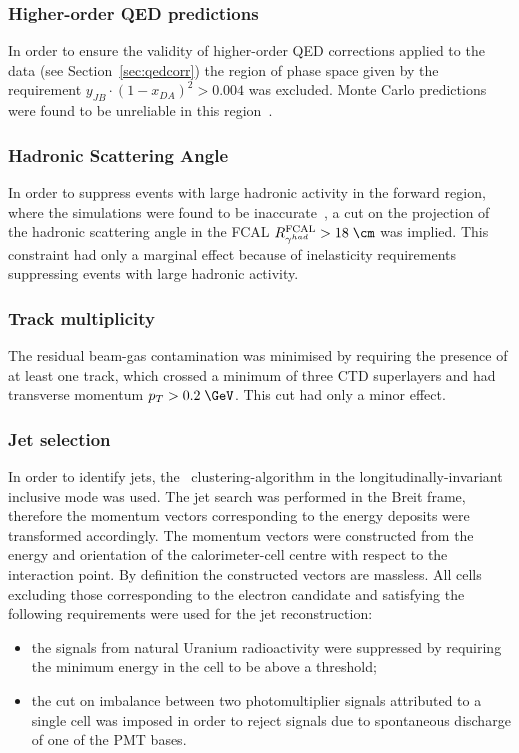\subsubsection{Higher-order QED predictions}
\label{subsubsec:qedcorcut}
In order to ensure the validity of higher-order QED corrections applied to the data (see Section~\ref{sec:qedcorr}) the region of phase space given by the requirement $y_{JB}\cdot\left(1-x_{DA}\right)^2>0.004$ was excluded. Monte Carlo predictions were found to be unreliable in this region~\cite{cpc:81:381}.

\subsubsection{Hadronic Scattering Angle}
\label{subsubsec:gammahadcut}
In order to suppress events with large hadronic activity in the forward region, where the simulations were found to be inaccurate~\cite{thesis:jose:2003}, a cut on the projection of the hadronic scattering angle in the FCAL $R^\text{FCAL}_{\gamma^{had}} > 18\;\cm$ was implied. This constraint had only a marginal effect because of inelasticity requirements suppressing events with large hadronic activity.

\subsubsection{Track multiplicity}
\label{subsubsec:trackmultcut}
The residual beam-gas contamination was minimised by requiring the presence of at least one track, which crossed a minimum of three CTD superlayers and had transverse momentum $p_T>0.2\;\GeV$. This cut had only a minor effect.

\subsubsection{Jet selection}
\label{subsubsec:jetselect}
In order to identify jets, the \kt~clustering-algorithm in the longitudinally-invariant inclusive mode was used. The jet search was performed in the Breit frame, therefore the momentum vectors corresponding to the energy deposits were transformed accordingly. The momentum vectors were constructed from the energy and orientation of the calorimeter-cell centre with respect to the interaction point. By definition the constructed vectors are massless. All cells excluding those corresponding to the electron candidate and satisfying the following requirements were used for the jet reconstruction:
\begin{itemize}
	\item the signals from natural Uranium radioactivity were suppressed by requiring the minimum energy in the cell to be above a threshold;
	\item the cut on imbalance between two photomultiplier signals attributed to a single cell was imposed in order to reject signals due to spontaneous discharge of one of the PMT bases.
\end{itemize}

